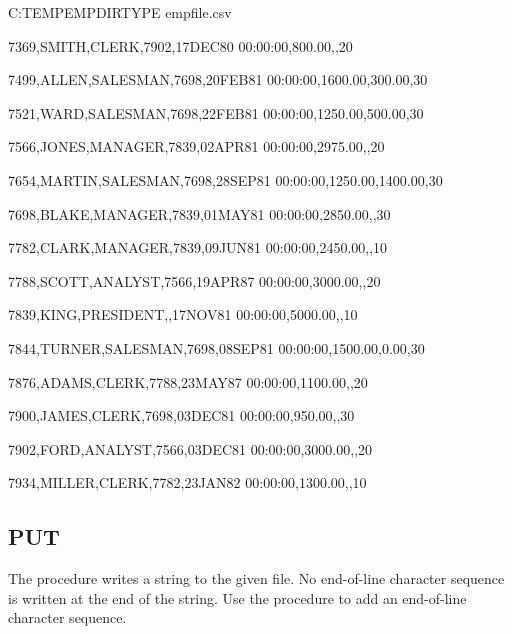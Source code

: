 \documentclass[letterpaper,10pt,english,openany,oneside]{sphinxmanual}
\begin{document}
%
\begin{sphinxVerbatim}[commandchars=\\\{\}]
C:\PYGZbs{}TEMP\PYGZbs{}EMPDIR\PYGZgt{}TYPE empfile.csv

7369,SMITH,CLERK,7902,17\PYGZhy{}DEC\PYGZhy{}80 00:00:00,800.00,,20

7499,ALLEN,SALESMAN,7698,20\PYGZhy{}FEB\PYGZhy{}81 00:00:00,1600.00,300.00,30

7521,WARD,SALESMAN,7698,22\PYGZhy{}FEB\PYGZhy{}81 00:00:00,1250.00,500.00,30

7566,JONES,MANAGER,7839,02\PYGZhy{}APR\PYGZhy{}81 00:00:00,2975.00,,20

7654,MARTIN,SALESMAN,7698,28\PYGZhy{}SEP\PYGZhy{}81 00:00:00,1250.00,1400.00,30

7698,BLAKE,MANAGER,7839,01\PYGZhy{}MAY\PYGZhy{}81 00:00:00,2850.00,,30

7782,CLARK,MANAGER,7839,09\PYGZhy{}JUN\PYGZhy{}81 00:00:00,2450.00,,10

7788,SCOTT,ANALYST,7566,19\PYGZhy{}APR\PYGZhy{}87 00:00:00,3000.00,,20

7839,KING,PRESIDENT,,17\PYGZhy{}NOV\PYGZhy{}81 00:00:00,5000.00,,10

7844,TURNER,SALESMAN,7698,08\PYGZhy{}SEP\PYGZhy{}81 00:00:00,1500.00,0.00,30

7876,ADAMS,CLERK,7788,23\PYGZhy{}MAY\PYGZhy{}87 00:00:00,1100.00,,20

7900,JAMES,CLERK,7698,03\PYGZhy{}DEC\PYGZhy{}81 00:00:00,950.00,,30

7902,FORD,ANALYST,7566,03\PYGZhy{}DEC\PYGZhy{}81 00:00:00,3000.00,,20

7934,MILLER,CLERK,7782,23\PYGZhy{}JAN\PYGZhy{}82 00:00:00,1300.00,,10
\end{sphinxVerbatim}

\ignorespaces 

\subsection{PUT}
\label{\detokenize{utl_file:put}}\label{\detokenize{utl_file:index-12}}
The  procedure writes a string to the given file. No end-of-line
character sequence is written at the end of the string. Use the
 procedure to add an end-of-line character sequence.
\begin{quote}


\end{quote}
\end{document}
